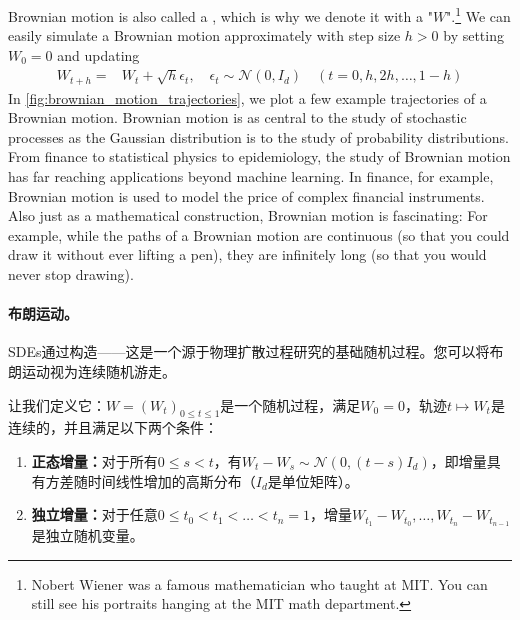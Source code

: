Brownian motion is also called a , which is why we denote it with a "$W$".\footnote{Nobert Wiener was a famous mathematician who taught at MIT. You can still see his portraits hanging at the MIT math department.} We can easily simulate a Brownian motion approximately with step size $h>0$ by setting $W_0=0$ and updating
\begin{align}
    \label{eq:brownian_motion_simulation}
    W_{t+h} =& W_{t} + \sqrt{h}\epsilon_t,\quad \epsilon_t\sim\mathcal{N}(0,I_d)\quad (t=0,h,2h,\dots,1-h)
\end{align}
In \cref{fig:brownian_motion_trajectories}, we plot a few example trajectories of a Brownian motion.  Brownian motion is as central to the study of stochastic processes as the Gaussian distribution is to the study of probability distributions. From finance to statistical physics to epidemiology, the study of Brownian motion has far reaching applications beyond  machine learning. In finance, for example, Brownian motion is used to model the price of complex financial instruments. Also just as a mathematical construction, Brownian motion is fascinating: For example, while the paths of a Brownian motion are continuous (so that you could draw it without ever lifting a pen), they are infinitely long (so that you would never stop drawing).

\paragraph{布朗运动。} SDEs通过构造——这是一个源于物理扩散过程研究的基础随机过程。您可以将布朗运动视为连续随机游走。

让我们定义它：$W = (W_t)_{0\leq t\leq 1}$是一个随机过程，满足$W_0=0$，轨迹$t\mapsto W_t$是连续的，并且满足以下两个条件：
\begin{enumerate}
    \item \textbf{正态增量：}对于所有$0\leq s<t$，有$W_{t}-W_{s}\sim \mathcal{N}(0,(t-s)I_d)$，即增量具有方差随时间线性增加的高斯分布（$I_d$是单位矩阵）。
    \item \textbf{独立增量：}对于任意$0\leq t_0<t_1<\dots <t_n=1$，增量$W_{t_1}-W_{t_0},\dots,W_{t_n}-W_{t_{n-1}}$是独立随机变量。
\end{enumerate}

